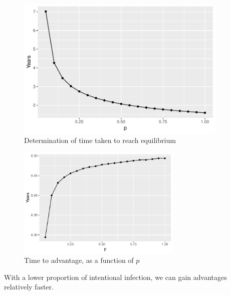 \documentclass[12pt]{beamer}
\begin{document}
\begin{frame}
\begin{figure}[h]
  \centering
  \includegraphics[width=0.9\textwidth]{Figures/Time_to_EE_plot.pdf}
  \caption{Determination of time taken to reach equilibrium}
\end{figure}
\end{frame}
\begin{frame}
\begin{figure}[H]
  \centering
  \includegraphics[width=0.7\textwidth]{Figures/Time_to_advantage_plot.pdf}
  \caption{Time to advantage, as a function of $p$}
\end{figure}
With a lower proportion of intentional infection, we can gain advantages relatively faster.
\end{frame}
\end{document}
